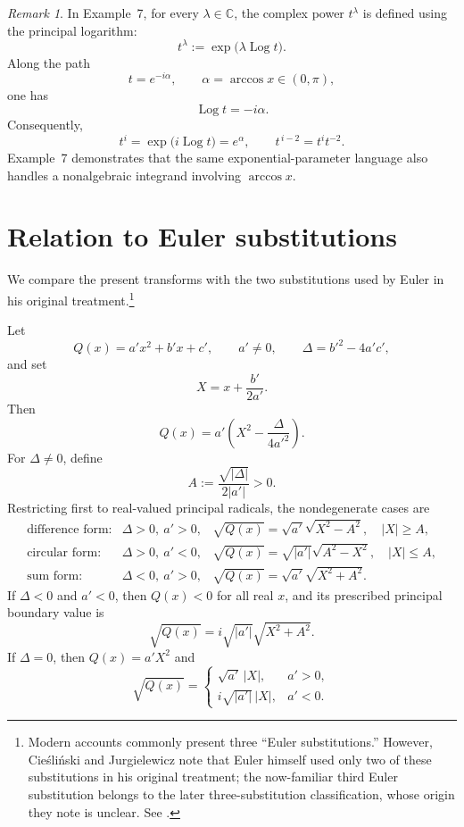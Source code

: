 \documentclass[11pt]{article}
\theoremstyle{remark}
\newtheorem*{remark}{Remark}
\DeclareMathOperator{\Logop}{Log}
\begin{document}
\begin{remark}
In Example~7, for every \(\lambda\in\mathbb C\), the complex power
\(t^\lambda\) is defined using the principal logarithm:
\[
t^\lambda:=\exp\!\bigl(\lambda\Logop t\bigr).
\]
Along the path
\[
t=e^{-i\alpha},
\qquad
\alpha=\arccos x\in(0,\pi),
\]
one has
\[
\Logop t=-i\alpha.
\]
Consequently,
\[
t^i=\exp\!\bigl(i\Logop t\bigr)=e^\alpha,
\qquad
t^{\,i-2}=t^i t^{-2}.
\]
Example~7 demonstrates that the same exponential-parameter language also handles a nonalgebraic integrand involving \(\arccos x\).
\end{remark}

\section{Relation to Euler substitutions}

We compare the present transforms with the two substitutions used by
Euler in his original treatment.\footnote{Modern accounts commonly
present three ``Euler substitutions.'' However, Cie\'sli\'nski and
Jurgielewicz note that Euler himself used only two of these
substitutions in his original treatment; the now-familiar third Euler
substitution belongs to the later three-substitution classification,
whose origin they note is unclear. See
\cite[\S2.4]{CieslinskiJurgielewicz}.}

Let
\[
Q(x)=a'x^2+b'x+c',
\qquad a'\ne0,
\qquad \Delta=b'^2-4a'c',
\]
and set
\[
X=x+\frac{b'}{2a'}.
\]
Then
\[
Q(x)=a'\left(X^2-\frac{\Delta}{4a'^2}\right).
\]
For $\Delta\ne0$, define
\[
A:=\frac{\sqrt{|\Delta|}}{2|a'|}>0.
\]
Restricting first to real-valued principal radicals, the nondegenerate cases are
\[
\begin{array}{lll}
\text{difference form:}&\Delta>0,\ a'>0,
&\sqrt{Q(x)}=\sqrt{a'}\sqrt{X^2-A^2},\quad |X|\ge A,\\[1mm]
\text{circular form:}&\Delta>0,\ a'<0,
&\sqrt{Q(x)}=\sqrt{|a'|}\sqrt{A^2-X^2},\quad |X|\le A,\\[1mm]
\text{sum form:}&\Delta<0,\ a'>0,
&\sqrt{Q(x)}=\sqrt{a'}\sqrt{X^2+A^2}.
\end{array}
\]
If $\Delta<0$ and $a'<0$, then $Q(x)<0$ for all real $x$, and its prescribed principal boundary value is
\[
\sqrt{Q(x)}=i\sqrt{|a'|}\sqrt{X^2+A^2}.
\]
If $\Delta=0$, then $Q(x)=a'X^2$ and
\[
\sqrt{Q(x)}=
\begin{cases}
\sqrt{a'}\,|X|,&a'>0,\\[1mm]
i\sqrt{|a'|}\,|X|,&a'<0.
\end{cases}
\]
\end{document}
